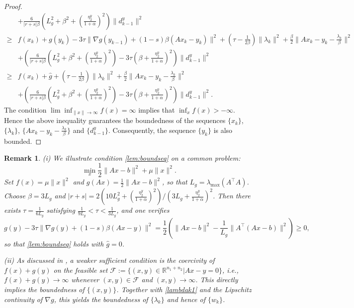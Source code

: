 \documentclass[pdflatex,sn-mathphys-num]{sn-jnl}%
\theoremstyle{thmstyleone}%
\theoremstyle{thmstyletwo}%
\newtheorem{remark}{Remark}%
\theoremstyle{thmstylethree}%
\begin{document}
\begin{proof}
\[\begin{aligned}
		&+\frac{6}{|r+s|\beta}\left(L_g^2+\beta ^2+(\frac{\eta_2^y}{1+\alpha})^2\right)\|d^y_{k-1}\|^2\\
		\geq&f(x_k)+g(y_k)-3\tau\|\nabla g (y_{k-1})+(1-s)\beta(A x_{k}-y_{k})\|^2+(\tau-\frac{1}{2\beta})\|\lambda_k\|^2+\frac{\beta}{2}\|Ax_k-y_k-\frac{\lambda_k}{\beta}\|^2\\
		&+\left(\frac{6}{|r+s|\beta}\left(L_g^2+\beta ^2+(\frac{\eta_2^y}{1+\alpha})^2\right)-3\tau (\beta+\frac{\eta_2^y}{1+\alpha})^2\right)\|d^y_{k-1}\|^2\\
		\geq&f(x_k)+\hat{g}+(\tau-\frac{1}{2\beta})\|\lambda_k\|^2+\frac{\beta}{2}\|Ax_k-y_k-\frac{\lambda_k}{\beta}\|^2\\
		&+\left(\frac{6}{|r+s|\beta}\left(L_g^2+\beta ^2+(\frac{\eta_2^y}{1+\alpha})^2\right)-3\tau (\beta+\frac{\eta_2^y}{1+\alpha})^2\right)\|d^y_{k-1}\|^2.
	\end{aligned}\]
The condition $\lim\inf_{\|x\|\to\infty}f(x)=\infty$ implies that $\inf_x f(x)>-\infty$. Hence the above inequality guarantees the boundedness of the sequences $\{x_k\}$, $\{\lambda_k\}$, $\{Ax_k-y_k-\frac{\lambda_k}{\beta}\}$ and $\{d^y_{k-1}\}$. Consequently, the sequence $\{y_k\}$ is also bounded. 
\end{proof}

\begin{remark}
	(i) We illustrate condition \eqref{lem:boundseq} on a common problem:
	\[\min_x \frac{1}{2}\|Ax-b\|^2+\mu \|x\|^2.\]
	Set $f(x)=\mu \|x\|^2$ and $g(Ax)=\frac{1}{2}\|Ax-b\|^2$, so that $L_g=\lambda_{\max}(A^\top A)$. Choose $\beta=3L_g$ and $|r+s|=2\left(10L_g^2+(\frac{\eta_2^y}{1+\alpha})^2\right)/ (3L_g+\frac{\eta_2^y}{1+\alpha})^2$. Then there exists $\tau = \frac{1}{6L_g}$ satisfying $\frac{1}{9L_g} < \tau < \frac{1}{3L_g}$, and one verifies
	\[g(y)-3\tau \|\nabla g (y)+(1-s)\beta(A x-y)\|^2=\frac{1}{2}\left(\|Ax-b\|^2-\frac{1}{L_g}\|A^\top(Ax-b)\|^2\right)\geq 0,\]
	so that \eqref{lem:boundseq} holds with $\hat{g} = 0$.
	
	(ii) As discussed in \cite{WYZ19}, a weaker sufficient condition is the coercivity of $f(x)+g(y)$ on the feasible set $\mathcal{F}:= \{(x, y) \in \mathbb{R}^{n_1+n_2}|Ax - y = 0\}$, i.e., $f (x) + g(y) \to \infty$ whenever $(x, y)\in \mathcal{F}$ and $(x, y)\to \infty$.  This directly implies the boundedness of $\{(x, y)\}$. Together with \eqref{lambdak1} and the Lipschitz continuity of $\nabla g$, this yields the boundedness of $\{\lambda_k\}$ and hence of $\{w_k\}$.
\end{remark}
\end{document}
